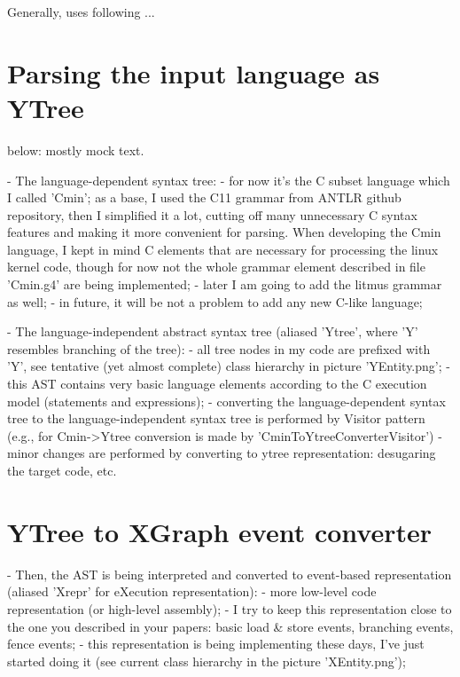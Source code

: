 Generally, \mousquetaires uses following  ...

\section{Parsing the input language as YTree}
\label{ch:impl:ytree}

below: mostly mock text.

- The language-dependent syntax tree:
        - for now it's the C subset language which I called 'Cmin'; as a base, I used the C11 grammar from ANTLR github repository, then I simplified it a lot, cutting off many unnecessary C syntax features and making it more convenient for parsing. When developing the Cmin language, I kept in mind C elements that are necessary for processing the linux kernel code, though for now not the whole grammar element described in file 'Cmin.g4' are being implemented;
        - later I am going to add the litmus grammar as well;
        - in future, it will be not a problem to add any new C-like language;

- The language-independent abstract syntax tree (aliased 'Ytree', where 'Y' resembles branching of the tree):
        - all tree nodes in my code are prefixed with 'Y', see tentative (yet almost complete) class hierarchy in picture 'YEntity.png';
        - this AST contains very basic language elements according to the C execution model (statements and expressions);
        - converting the language-dependent syntax tree to the language-independent syntax tree is performed by Visitor pattern (e.g., for Cmin->Ytree conversion is made by 'CminToYtreeConverterVisitor')
        - minor changes are performed by converting to ytree representation: desugaring the target code, etc.


\section{YTree to XGraph event converter}
\label{ch:impl:x2y}

- Then, the AST is being interpreted and converted to event-based representation (aliased 'Xrepr' for eXecution representation):
        - more low-level code representation (or high-level assembly);
        - I try to keep this representation close to the one you described in your papers: basic load \& store events, branching events, fence events;
        - this representation is being implementing these days, I've just started doing it (see current class hierarchy in the picture 'XEntity.png');
        
